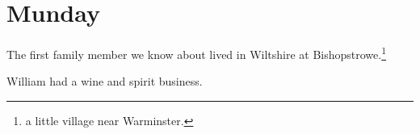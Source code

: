 \section{Munday}

The first family member we know about lived in Wiltshire at Bishopstrowe.\footnote{a little village near Warminster.}

William had a wine and spirit business.
